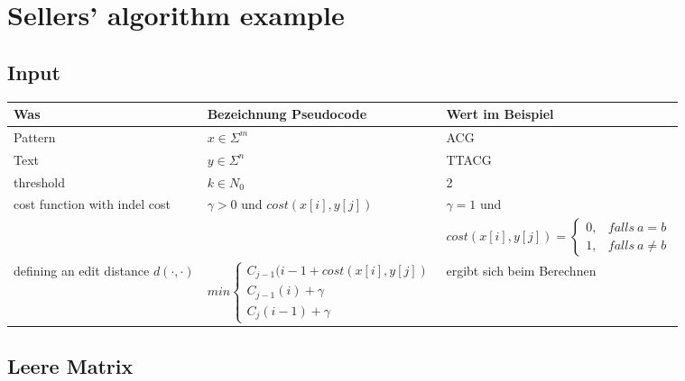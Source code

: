 

\section{Sellers' algorithm example}\label{sec:sellers-algorithm-example}

\subsection*{Input}
\begin{center}
    \begin{tabular}{|p{5cm}|p{5cm}|p{6cm}|} \hline
    \textbf{Was} & \textbf{Bezeichnung Pseudocode} &\textbf{Wert im Beispiel} \\ \hline
    Pattern & $x \in \Sigma^m$ & ACG \\ \hline
    Text &  $y \in \Sigma^n$ &   TTACG  \\\hline
    threshold & $k \in N_0$ & 2 \\\hline
    cost function with indel cost & $\gamma > 0$ und $cost(x[i], y[j])$ & $\gamma = 1$ und  \\ & &
    $cost(x[i], y[j])=\begin{cases}
                          0, & falls\ a=b \\ 1, & falls\ a \neq b
    \end{cases}$
    \\ \hline
    defining an edit distance $d(\cdot, \cdot)$ &  $min \begin{cases}
                                                            C_{j-1}(i-1 + cost(x[i], y[j]) \\
                                                            C_{j-1}(i) + \gamma \\ C_j (i-1) + \gamma
    \end{cases}$ & ergibt sich beim Berechnen \\ \hline
    \end{tabular}
\end{center}

\subsection*{Leere Matrix}

